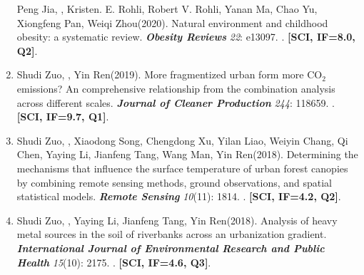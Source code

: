 \begin{enumerate}
    Peng Jia\CS, \Shaoqing, Kristen. E. Rohli, Robert V. Rohli, Yanan Ma, Chao Yu, Xiongfeng Pan, Weiqi Zhou\CS (2020).
    Natural environment and childhood obesity: a systematic review.
    \textbf{\textit{Obesity Reviews}} \textit{22}: e13097.
    . \textbf{[SCI, IF=8.0, Q2]}.
\item
    Shudi Zuo, \Shaoqing, Yin Ren\CS (2019).
    More fragmentized urban form more CO$_2$ emissions? An comprehensive relationship from the combination analysis across different scales.
    \textbf{\textit{Journal of Cleaner Production}} \textit{244}: 118659.
    . \textbf{[SCI, IF=9.7, Q1]}.
\item
    Shudi Zuo, \Shaoqing, Xiaodong Song, Chengdong Xu, Yilan Liao, Weiyin Chang, Qi Chen, Yaying Li, Jianfeng Tang, Wang Man, Yin Ren\CS (2018).
    Determining the mechanisms that influence the surface temperature of urban forest canopies by combining remote sensing methods, ground observations, and spatial statistical models. 
    \textbf{\textit{Remote Sensing}} \textit{10}(11): 1814.
    . \textbf{[SCI, IF=4.2, Q2]}.
\item
    Shudi Zuo, \Shaoqing, Yaying Li, Jianfeng Tang, Yin Ren\CS (2018).
	Analysis of heavy metal sources in the soil of riverbanks across an urbanization gradient.
    \textbf{\textit{International Journal of Environmental Research and Public Health}} \textit{15}(10): 2175.
    . \textbf{[SCI, IF=4.6, Q3]}.
\end{enumerate}

